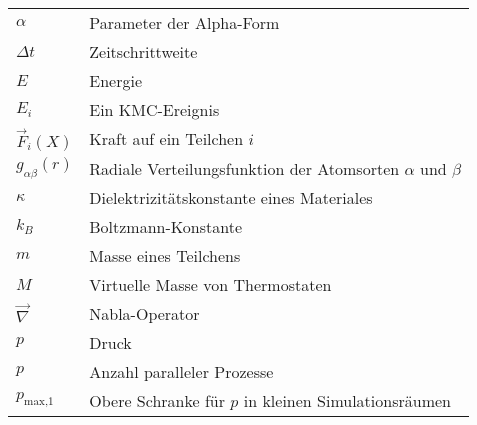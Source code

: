 {
\def\arraystretch{1.5}
\begin{longtable}{ll}
$\alpha$             & Parameter der Alpha-Form                                            \\
$\Delta t$           & Zeitschrittweite                                                    \\
$E$                  & Energie                                                             \\
$E_i$                & Ein KMC-Ereignis                                                    \\
$\vec F_i(X)$        & Kraft auf ein Teilchen $i$                                          \\
$g_{\alpha\beta}(r)$ & Radiale Verteilungsfunktion der Atomsorten $\alpha$ und $\beta$     \\
$\kappa$             & Dielektrizitätskonstante eines Materiales                           \\
$k_B$                & Boltzmann-Konstante                                                 \\
$m$                  & Masse eines Teilchens                                               \\
$M$                  & Virtuelle Masse von Thermostaten                                    \\
$\vec\nabla$         & Nabla-Operator                                                      \\
$p$                  & Druck                                                               \\
$p$                  & Anzahl paralleler Prozesse                                          \\
$p_\text{max,1}$     & Obere Schranke für $p$ in kleinen Simulationsräumen                 \\

\end{longtable}}
